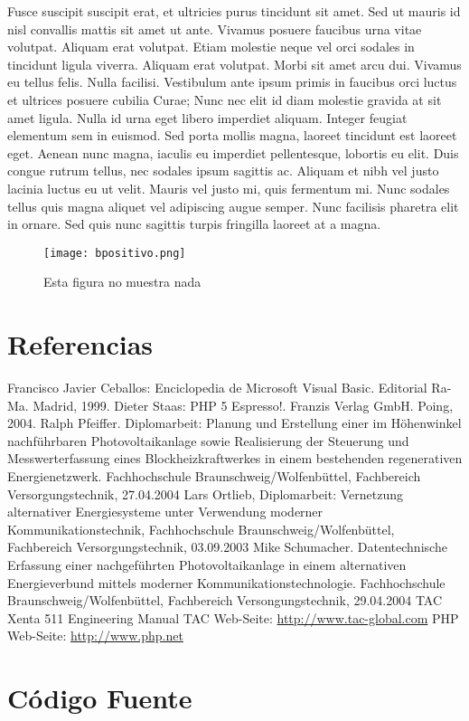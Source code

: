 \documentclass[twocolumn,a4paper,10pt]{article}
\begin{document}
Fusce suscipit suscipit erat, et ultricies purus tincidunt sit amet. Sed ut mauris id nisl convallis mattis sit amet ut ante. Vivamus posuere faucibus urna vitae volutpat. Aliquam erat volutpat. Etiam molestie neque vel orci sodales in tincidunt ligula viverra. Aliquam erat volutpat. Morbi sit amet arcu dui. Vivamus eu tellus felis.
Nulla facilisi. Vestibulum ante ipsum primis in faucibus orci luctus et ultrices posuere cubilia Curae; Nunc nec elit id diam molestie gravida at sit amet ligula. Nulla id urna eget libero imperdiet aliquam. Integer feugiat elementum sem in euismod. Sed porta mollis magna, laoreet tincidunt est laoreet eget. Aenean nunc magna, iaculis eu imperdiet pellentesque, lobortis eu elit. Duis congue rutrum tellus, nec sodales ipsum sagittis ac. Aliquam et nibh vel justo lacinia luctus eu ut velit. Mauris vel justo mi, quis fermentum mi. Nunc sodales tellus quis magna aliquet vel adipiscing augue semper. Nunc facilisis pharetra elit in ornare. Sed quis nunc sagittis turpis fringilla laoreet at a magna.
\begin{figure}
    \center \texttt{[image: bpositivo.png]}
    \caption{Esta figura no muestra nada}
\end{figure}


\section*{Referencias}
\begin{thebibliography}{99}
     Francisco Javier Ceballos: Enciclopedia de Microsoft Visual
        Basic. Editorial Ra-Ma. Madrid, 1999.
     Dieter Staas: PHP 5 Espresso!. Franzis Verlag GmbH.
        Poing, 2004.
     Ralph Pfeiffer. Diplomarbeit: Planung und
        Erstellung einer im Höhenwinkel nachführbaren Photovoltaikanlage
        sowie Realisierung der Steuerung und Messwerterfassung eines
        Blockheizkraftwerkes in einem bestehenden regenerativen
        Energienetzwerk. Fachhochschule Braunschweig/Wolfenbüttel,
        Fachbereich Versorgungstechnik, 27.04.2004
    Lars Ortlieb, Diplomarbeit: Vernetzung alternativer
        Energiesysteme unter Verwendung moderner Kommunikationstechnik,
        Fachhochschule Braunschweig/Wolfenbüttel, Fachbereich
        Versorgungstechnik, 03.09.2003
     Mike Schumacher. Datentechnische Erfassung einer
        nachgeführten Photovoltaikanlage in einem alternativen
        Energieverbund mittels moderner Kommunikationstechnologie.
        Fachhochschule Braunschweig/Wolfenbüttel, Fachbereich
        Versongungstechnik, 29.04.2004
     TAC Xenta 511 Engineering Manual
     TAC Web-Seite: \url{http://www.tac-global.com}
     PHP Web-Seite: \url{http://www.php.net}
\end{thebibliography}

\section*{Código Fuente}
    \label{codigo-compresionBruta2}
    
\end{document}
